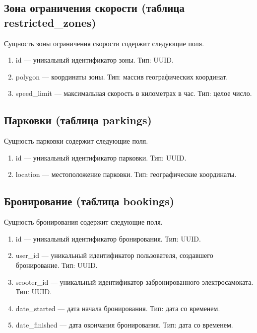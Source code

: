 \subsection{Зона ограничения скорости (таблица restricted\_zones)}

Сущность зоны ограничения скорости содержит следующие поля.

\begin{enumerate}
	\item id --- уникальный идентификатор зоны. Тип: UUID.
	\item polygon --- координаты зоны. Тип: массив географических координат.
	\item speed\_limit --- максимальная скорость в километрах в час. Тип: целое число.
\end{enumerate}

\subsection{Парковки (таблица parkings)}

Сущность парковки содержит следующие поля.

\begin{enumerate}
	\item id --- уникальный идентификатор парковки. Тип: UUID.
	\item location --- местоположение парковки. Тип: географические координаты.
\end{enumerate}

\subsection{Бронирование (таблица bookings)}

Сущность бронирования содержит следующие поля.

\begin{enumerate}
	\item id --- уникальный идентификатор бронирования. Тип: UUID.
	\item user\_id --- уникальный идентификатор пользователя, создавшего бронирование.
	      Тип: UUID.
	\item scooter\_id --- уникальный идентификатор забронированного электросамоката. Тип:
	      UUID.
	\item date\_started --- дата начала бронирования. Тип: дата со временем.
	\item date\_finished --- дата окончания бронирования. Тип: дата со временем.
\end{enumerate}

